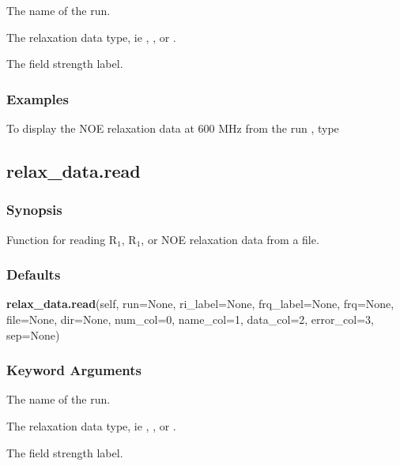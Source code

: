    The name of the run.   

   The relaxation data type, ie , , or .   

   The field strength label.  

  

  
 \subsubsection{Examples} 

 To display the NOE relaxation data at 600 MHz from the run , type 
  


  

 \newpage 

 \subsection{relax\_data.read} 

  
 \subsubsection{Synopsis} 

 Function for reading R$_1$, R$_1$, or NOE relaxation data from a file. 
  

  
 \subsubsection{Defaults} 

 \textsf{\textbf{relax\_data.read}(self, run=None, ri\_label=None, frq\_label=None, frq=None, file=None, dir=None, num\_col=0, name\_col=1, data\_col=2, error\_col=3, sep=None)} 

  
 \subsubsection{Keyword Arguments} 

   The name of the run.   

   The relaxation data type, ie , , or .   

   The field strength label.   

